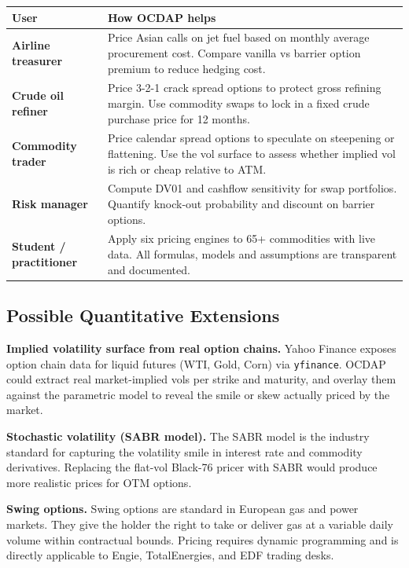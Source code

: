 \documentclass[11pt,a4paper]{article}
\begin{document}
\begin{center}
\begin{tabularx}{\textwidth}{>{\bfseries}l X}
\toprule
User & How OCDAP helps \\
\midrule
Airline treasurer
  & Price Asian calls on jet fuel based on monthly average procurement cost.
    Compare vanilla vs barrier option premium to reduce hedging cost. \\
Crude oil refiner
  & Price 3-2-1 crack spread options to protect gross refining margin.
    Use commodity swaps to lock in a fixed crude purchase price for 12 months. \\
Commodity trader
  & Price calendar spread options to speculate on steepening or flattening.
    Use the vol surface to assess whether implied vol is rich or cheap
    relative to ATM. \\
Risk manager
  & Compute DV01 and cashflow sensitivity for swap portfolios.
    Quantify knock-out probability and discount on barrier options. \\
Student / practitioner
  & Apply six pricing engines to 65+ commodities with live data.
    All formulas, models and assumptions are transparent and documented. \\
\bottomrule
\end{tabularx}
\end{center}

\subsection{Possible Quantitative Extensions}

\textbf{Implied volatility surface from real option chains.}
Yahoo Finance exposes option chain data for liquid futures (WTI, Gold, Corn)
via \texttt{yfinance}. OCDAP could extract real market-implied vols per strike
and maturity, and overlay them against the parametric model to reveal the smile
or skew actually priced by the market.

\textbf{Stochastic volatility (SABR model).}
The SABR model is the industry standard for capturing the volatility smile in
interest rate and commodity derivatives. Replacing the flat-vol Black-76 pricer
with SABR would produce more realistic prices for OTM options.

\textbf{Swing options.}
Swing options are standard in European gas and power markets. They give the holder
the right to take or deliver gas at a variable daily volume within contractual bounds.
Pricing requires dynamic programming and is directly applicable to Engie, TotalEnergies,
and EDF trading desks.
\end{document}
